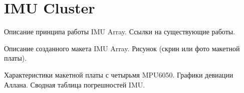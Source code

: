 \section {IMU Cluster}
Описание принципа работы IMU Array. Ссылки на существующие работы.

Описание созданного макета IMU Array. Рисунок (скрин или фото макетной платы).

Характеристики макетной платы с четырьмя MPU6050. Графики девиации Аллана. Сводная таблица погрешностей IMU.